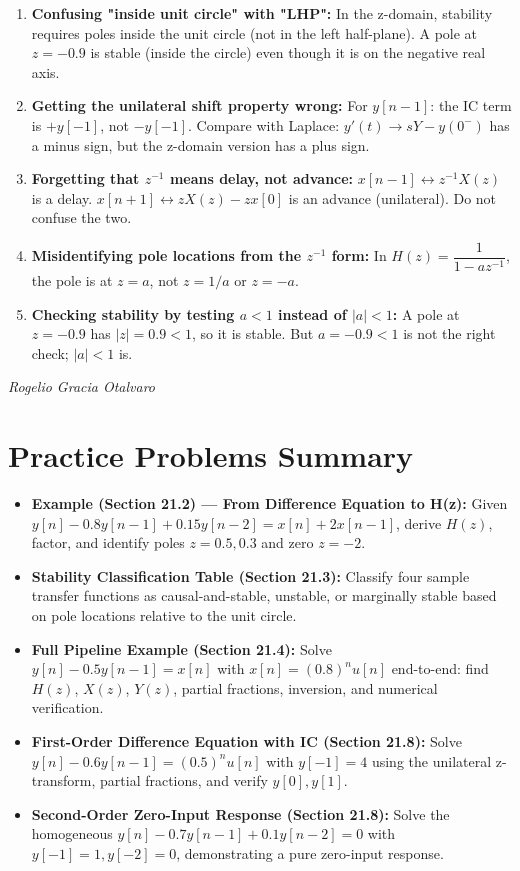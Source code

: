 \documentclass[11pt]{article}
\begin{document}
\begin{enumerate}
  \item \textbf{Confusing "inside unit circle" with "LHP":} In the z-domain, stability requires poles inside the unit circle (not in the left half-plane). A pole at $z = -0.9$ is stable (inside the circle) even though it is on the negative real axis.
  \item \textbf{Getting the unilateral shift property wrong:} For $y[n-1]$: the IC term is $+y[-1]$, not $-y[-1]$. Compare with Laplace: $y'(t) \to sY - y(0^-)$ has a minus sign, but the z-domain version has a plus sign.
  \item \textbf{Forgetting that $z^{-1}$ means delay, not advance:} $x[n-1] \leftrightarrow z^{-1} X(z)$ is a delay. $x[n+1] \leftrightarrow z X(z) - z x[0]$ is an advance (unilateral). Do not confuse the two.
  \item \textbf{Misidentifying pole locations from the $z^{-1}$ form:} In $H(z) = \dfrac{1}{1 - a z^{-1}}$, the pole is at $z = a$, not $z = 1/a$ or $z = -a$.
  \item \textbf{Checking stability by testing $a < 1$ instead of $|a| < 1$:} A pole at $z = -0.9$ has $|z| = 0.9 < 1$, so it is stable. But $a = -0.9 < 1$ is not the right check; $|a| < 1$ is.
\end{enumerate}

\textit{Rogelio Gracia Otalvaro}

\section*{Practice Problems Summary}

\begin{itemize}
  \item \textbf{Example (Section 21.2) — From Difference Equation to H(z):} Given $y[n] - 0.8 y[n-1] + 0.15 y[n-2] = x[n] + 2 x[n-1]$, derive $H(z)$, factor, and identify poles $z = 0.5, 0.3$ and zero $z = -2$.
  \item \textbf{Stability Classification Table (Section 21.3):} Classify four sample transfer functions as causal-and-stable, unstable, or marginally stable based on pole locations relative to the unit circle.
  \item \textbf{Full Pipeline Example (Section 21.4):} Solve $y[n] - 0.5 y[n-1] = x[n]$ with $x[n] = (0.8)^n u[n]$ end-to-end: find $H(z)$, $X(z)$, $Y(z)$, partial fractions, inversion, and numerical verification.
  \item \textbf{First-Order Difference Equation with IC (Section 21.8):} Solve $y[n] - 0.6 y[n-1] = (0.5)^n u[n]$ with $y[-1] = 4$ using the unilateral z-transform, partial fractions, and verify $y[0], y[1]$.
  \item \textbf{Second-Order Zero-Input Response (Section 21.8):} Solve the homogeneous $y[n] - 0.7 y[n-1] + 0.1 y[n-2] = 0$ with $y[-1] = 1, y[-2] = 0$, demonstrating a pure zero-input response.
\end{itemize}
\end{document}
